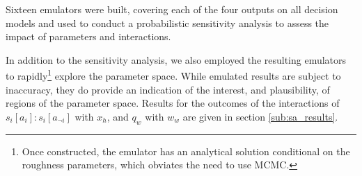 Sixteen emulators were built, covering each of the four outputs on all decision models and used to conduct a probabilistic sensitivity analysis to assess the impact of parameters and interactions.

In addition to the sensitivity analysis, we also employed the resulting emulators to rapidly\footnote{Once constructed, the emulator has an analytical solution conditional on the roughness parameters, which obviates the need to use MCMC.} explore the parameter space. While emulated results are subject to inaccuracy, they do provide an indication of the interest, and plausibility, of regions of the parameter space. Results for the outcomes of the interactions of \(s_{i}[a_{i}]:s_{i}[a_{\neg i}]\) with \(x_{h}\), and \(q_{w}\) with \(w_{w}\) are given in section \ref{sub:sa_results}.